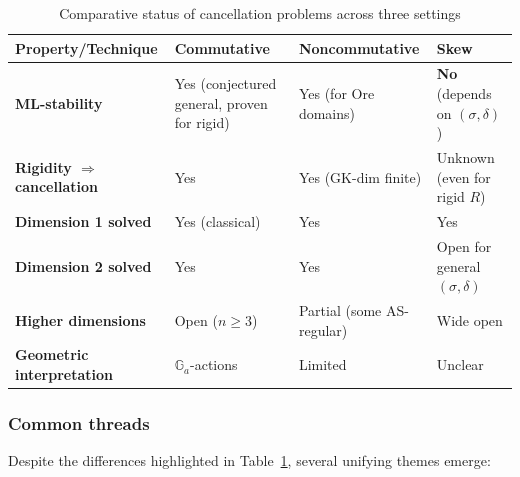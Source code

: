 \documentclass{amsart}
\theoremstyle{plain}
\numberwithin{theorem}{section}
\numberwithin{equation}{theorem}
\theoremstyle{definition}
\begin{document}
\begin{table}[h]
\centering
\renewcommand{\arraystretch}{1.3}
\begin{tabular}{p{4cm}p{3cm}p{3cm}p{3cm}}
\toprule
\textbf{Property/Technique} & \textbf{Commutative} & \textbf{Noncommutative} & \textbf{Skew} \\
\midrule
\textbf{ML-stability} & Yes (conjectured general, proven for rigid) & Yes (for Ore domains) & \textbf{No} (depends on $(\sigma,\delta)$) \\[0.3em]
\midrule
\textbf{Rigidity $\Rightarrow$ cancellation} & Yes & Yes (GK-dim finite) & Unknown (even for rigid $R$) \\[0.3em]
\midrule
\textbf{Dimension 1 solved} & Yes (classical) & Yes \cite{BHHV} & Yes \cite{BHHV} \\[0.3em]
\midrule
\textbf{Dimension 2 solved} & Yes \cite{Fu,MS,Ru} & Yes \cite{BellZhang2017} & Open for general $(\sigma,\delta)$ \\[0.3em]
\midrule
\textbf{Higher dimensions} & Open ($n \geq 3$) & Partial (some AS-regular) & Wide open \\[0.3em]
\midrule
\textbf{Geometric interpretation} & $\mathbb{G}_a$-actions & Limited & Unclear \\[0.3em]
\bottomrule
\end{tabular}
\caption{Comparative status of cancellation problems across three settings}
\label{tab:comparison}
\end{table}

\subsubsection*{Common threads}

Despite the differences highlighted in Table~\ref{tab:comparison}, several unifying themes emerge:
\end{document}
